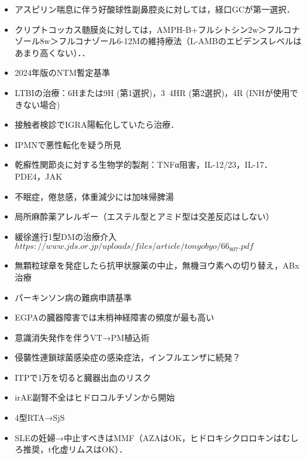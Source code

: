 \begin{itemize}

\item アスピリン喘息に伴う好酸球性副鼻腔炎に対しては，経口GCが第一選択．

\item クリプトコッカス髄膜炎に対しては，AMPH-B+フルシトシン2w＞フルコナゾール8w＞フルコナゾール6-12Mの維持療法（L-AMBのエビデンスレベルはあまり高くない）．．


\item 2024年版のNTM暫定基準
\item LTBIの治療：6Hまたは9H (第1選択)，3~4HR (第2選択)，4R (INHが使用できない場合)
\item 接触者検診でIGRA陽転化していたら治療．
\item IPMNで悪性転化を疑う所見
\item 乾癬性関節炎に対する生物学的製剤：TNFα阻害，IL-12/23，IL-17．PDE4，JAK

\item 不眠症，倦怠感，体重減少には加味帰脾湯

\item 局所麻酔薬アレルギー（エステル型とアミド型は交差反応はしない）

\item 緩徐進行1型DMの治療介入 $https://www.jds.or.jp/uploads/files/article/tonyobyo/66_807.pdf$


\item 無顆粒球章を発症したら抗甲状腺薬の中止，無機ヨウ素への切り替え，ABx治療

\item パーキンソン病の難病申請基準

\item EGPAの臓器障害では末梢神経障害の頻度が最も高い

\item 意識消失発作を伴うVT→PM植込術

\item 侵襲性連鎖球菌感染症の感染症法，インフルエンザに続発？

\item ITPで1万を切ると臓器出血のリスク

\item irAE副腎不全はヒドロコルチゾンから開始

\item 4型RTA→SjS

\item SLEの妊婦→中止すべきはMMF（AZAはOK，ヒドロキシクロロキンはむしろ推奨，t化虚リムスはOK）．


\end{itemize}
